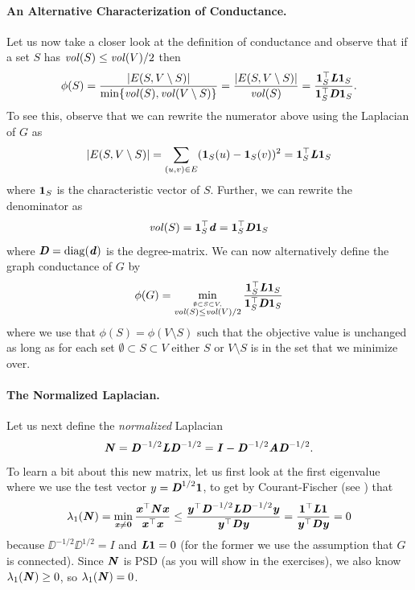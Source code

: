 \paragraph{An Alternative Characterization of Conductance.} Let us now take a closer look at the definition of conductance and observe that if a set $S$ has $\mathit{vol}(S) \leq \mathit{vol}(V)/2$ then
\[
\phi(S) = \frac{|E(S, V \setminus S)|}{ \min\{\mathit{vol}(S), \mathit{vol}(V \setminus S)\} } = \frac{|E(S, V \setminus S)|}{ \mathit{vol}(S) } = \frac{\boldsymbol{1}_S^\top \boldsymbol{\mathit{L}} \boldsymbol{1}_S}{\boldsymbol{1}_S^\top \boldsymbol{\mathit{D}} \boldsymbol{1}_S}.
\]
To see this, observe that we can rewrite the numerator above using the Laplacian of $G$ as
\[
|E(S, V \setminus S)| = \sum_{(u,v)\in E} (\boldsymbol{1}_S(u) - \boldsymbol{1}_S(v))^2 =  \boldsymbol{1}_S^\top \boldsymbol{\mathit{L}} \boldsymbol{1}_S
\]
where $\boldsymbol{1}_S$ is the characteristic vector of $S$. Further, we can rewrite the denominator as 
\[
\mathit{vol}(S) = \boldsymbol{1}_S^\top \boldsymbol{\mathit{d}} = \boldsymbol{1}_S^\top \boldsymbol{\mathit{D}} \boldsymbol{1}_S
\]
where $\boldsymbol{\mathit{D}} = \operatorname*{diag}(\boldsymbol{\mathit{d}})$ is the degree-matrix. We can now alternatively define the graph conductance of $G$ by
\begin{equation}\label{eq:conductanceAltDef}
\phi(G) = \min_{\stackrel{\emptyset \subset S \subset V,} {\mathit{vol}(S) \leq \mathit{vol}(V)/2}} \frac{\boldsymbol{1}_S^\top \boldsymbol{\mathit{L}} \boldsymbol{1}_S}{\boldsymbol{1}_S^\top \boldsymbol{\mathit{D}} \boldsymbol{1}_S} 
\end{equation}
where we use that $\phi(S) = \phi(V \setminus S)$ such that the objective value is unchanged as long as for each set $\emptyset \subset S \subset V$ either $S$ or $V \setminus S$ is in the set that we minimize over.

\paragraph{The Normalized Laplacian.} Let us next define the \emph{normalized} Laplacian \[
\boldsymbol{\mathit{N}} = \boldsymbol{\mathit{D}}^{-1/2} \boldsymbol{\mathit{L}} \boldsymbol{\mathit{D}}^{-1/2} = \boldsymbol{\mathit{I}} -  \boldsymbol{\mathit{D}}^{-1/2} \boldsymbol{\mathit{A}} \boldsymbol{\mathit{D}}^{-1/2}.
\]
To learn a bit about this new matrix, let us first look at the first eigenvalue where we use the test vector $y = \boldsymbol{\mathit{D}}^{1/2}\boldsymbol{1}$, to get by Courant-Fischer (see ) that
\begin{align}\label{eq:plugInNormalizedVector}
    \lambda_1(\boldsymbol{\mathit{N}}) =
    \min_{
      \substack{ \boldsymbol{\mathit{x}} \neq \boldsymbol{0}}
    }
    \frac{\boldsymbol{\mathit{x}}^\top \boldsymbol{\mathit{N}}\boldsymbol{\mathit{x}}}{\boldsymbol{\mathit{x}}^\top\boldsymbol{\mathit{x}}}  \leq \frac{\boldsymbol{\mathit{y}}^\top\boldsymbol{\mathit{D}}^{-1/2} \boldsymbol{\mathit{L}} \boldsymbol{\mathit{D}}^{-1/2} \boldsymbol{\mathit{y}}}{\boldsymbol{\mathit{y}}^\top\boldsymbol{\mathit{D}}\boldsymbol{\mathit{y}}} = \frac{\boldsymbol{1}^\top \boldsymbol{\mathit{L}} \boldsymbol{1}}{\boldsymbol{\mathit{y}}^\top\boldsymbol{\mathit{D}}\boldsymbol{\mathit{y}}} = 0
\end{align}
because $\DD^{-1/2} \DD^{1/2} = I$ and $\boldsymbol{\mathit{L}} \boldsymbol{1} = 0$ (for the former we use the assumption that $G$ is connected). Since $\boldsymbol{\mathit{N}}$ is PSD (as you will show in the exercises), we also know $\lambda_1(\boldsymbol{\mathit{N}}) \geq 0$, so $\lambda_1(\boldsymbol{\mathit{N}}) = 0$.

